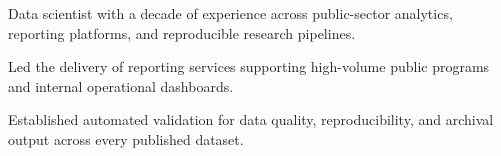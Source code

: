 \documentclass[fontsize=11pt, margin=narrow]{careerdossier-resume}
\begin{document}
\MakeCDossierHeader

Data scientist with a decade of experience across public-sector analytics,
reporting platforms, and reproducible research pipelines.

\begin{CDossierEntry}[title = {Principal Data Scientist}, organization = {Digital Services Laboratory}, location = {Ottawa, ON}, dates = {2024--Present}]
  \begin{CDossierItemize}
    \item Led the delivery of reporting services supporting high-volume public programs and internal operational dashboards.
    \item Established automated validation for data quality, reproducibility, and archival output across every published dataset.
  \end{CDossierItemize}
\end{CDossierEntry}

\newpage

\begin{CDossierEntry}[title = {Ph.D. in Computer Science}, organization = {University of Toronto}, location = {Toronto, ON}, dates = {2021--2026}]
\end{CDossierEntry}
\begin{CDossierEntry}[title = {B.A.Sc. in Computer Engineering, Honours}, organization = {University of Waterloo}, location = {Waterloo, ON}, dates = {2014--2019}]
\end{CDossierEntry}
\end{document}
